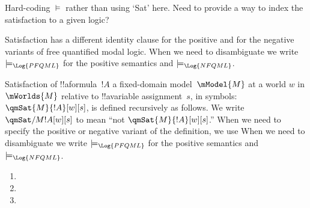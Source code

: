 \documentclass[../../../include/open-logic-section]{subfiles}
\begin{document}
\begin{editorial}
  Hard-coding $\models$ rather than using `Sat' here. 
  Need to provide a way to index the satisfaction to a given logic?
\end{editorial}

Satisfaction has a different identity clause for the 
positive and for the negative variants of free quantified 
modal logic. When we need to disambiguate we write
 $\models_{\Log{PFQML}}$ for the positive semantics and
 $\models_{\Log{NFQML}}$. 

\begin{defn}
Satisfaction of !!a{formula}~$!A$ a fixed-domain model~$\mModel{M}$
at a world $w$ in $\mWorlds{M}$ relative to !!a{variable} assignment~$s$, in symbols:
$\qmSat{M}{!A}[w][s]$, is defined recursively as follows. We write
$\qmSat/{M}{!A}[w][s]$ to mean ``not $\qmSat{M}{!A}[w][s]$.'' 
When we need to specify the positive or negative variant of 
the definition, we use  When we need to disambiguate we write
 $\models_{\Log{PFQML}}$ for the positive semantics and
 $\models_{\Log{NFQML}}$. 
\begin{enumerate}


\item {}

\item {}

\item {}



\end{enumerate}
\end{defn}
\end{document}
